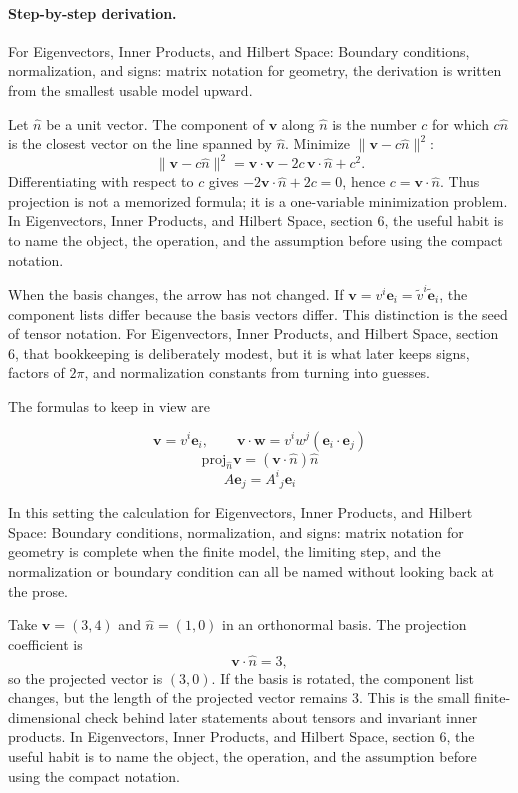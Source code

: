 \paragraph{Step-by-step derivation.}

For Eigenvectors, Inner Products, and Hilbert Space: Boundary conditions, normalization, and signs: matrix notation for geometry, the derivation is written from the smallest usable model upward.

Let \(\hat n\) be a unit vector.  The component of \(\bm v\) along \(\hat n\) is the number \(c\) for which \(c\hat n\) is the closest vector on the line spanned by \(\hat n\).  Minimize \(\|\bm v-c\hat n\|^2\):
\[
  \|\bm v-c\hat n\|^2=\bm v\cdot\bm v-2c\,\bm v\cdot\hat n+c^2.
\]
Differentiating with respect to \(c\) gives \(-2\bm v\cdot\hat n+2c=0\), hence \(c=\bm v\cdot\hat n\).  Thus projection is not a memorized formula; it is a one-variable minimization problem.  In Eigenvectors, Inner Products, and Hilbert Space, section 6, the useful habit is to name the object, the operation, and the assumption before using the compact notation.

When the basis changes, the arrow has not changed.  If \(\bm v=v^i\bm e_i=\tilde v^i\tilde{\bm e}_i\), the component lists differ because the basis vectors differ.  This distinction is the seed of tensor notation.  For Eigenvectors, Inner Products, and Hilbert Space, section 6, that bookkeeping is deliberately modest, but it is what later keeps signs, factors of \(2\pi\), and normalization constants from turning into guesses.

The formulas to keep in view are

\[
  \bm v=v^i\bm e_i,\qquad \bm v\cdot\bm w=v^iw^j(\bm e_i\cdot\bm e_j)
\]
\[
  \mathrm{proj}_{\hat n}\bm v=(\bm v\cdot\hat n)\hat n
\]
\[
  A\bm e_j=A^i{}_j\bm e_i
\]

In this setting the calculation for Eigenvectors, Inner Products, and Hilbert Space: Boundary conditions, normalization, and signs: matrix notation for geometry is complete when the finite model, the limiting step, and the normalization or boundary condition can all be named without looking back at the prose.




\begin{example}
Take \(\bm v=(3,4)\) and \(\hat n=(1,0)\) in an orthonormal basis.  The projection coefficient is
\[
  \bm v\cdot\hat n=3,
\]
so the projected vector is \((3,0)\).  If the basis is rotated, the component list changes, but the length of the projected vector remains \(3\).  This is the small finite-dimensional check behind later statements about tensors and invariant inner products.  In Eigenvectors, Inner Products, and Hilbert Space, section 6, the useful habit is to name the object, the operation, and the assumption before using the compact notation.
\end{example}



